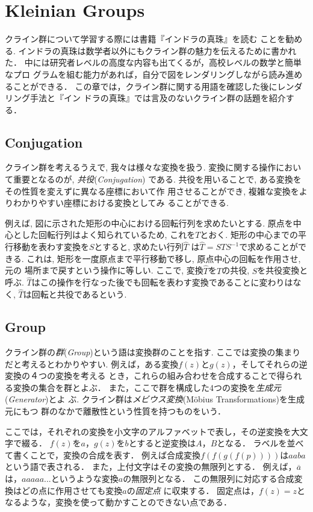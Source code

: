 
\section{Kleinian Groups}

クライン群について学習する際には書籍『インドラの真珠』\cite{indra}を読む
ことを勧める.
インドラの真珠は数学者以外にもクライン群の魅力を伝えるために書かれた．
中には研究者レベルの高度な内容も出てくるが，高校レベルの数学と簡単なプロ
グラムを組む能力があれば，自分で図をレンダリングしながら読み進めることができる．
この章では，クライン群に関する用語を確認した後にレンダリング手法と『イン
ドラの真珠』では言及のないクライン群の話題を紹介する．

\subsection{Conjugation}

クライン群を考えるうえで, 我々は様々な変換を扱う.
変換に関する操作において重要となるのが, \emph{共役}(\textit{Conjugation})
である.
共役を用いることで, ある変換をその性質を変えずに異なる座標において作
用させることができ, 複雑な変換をよりわかりやすい座標における変換としてみ
ることができる.

例えば, 図に示された矩形の中心における回転行列を求めたいとする.
原点を中心とした回転行列はよく知られているため, これを$T$とおく.
矩形の中心までの平行移動を表わす変換を$S$とすると, 求めたい行列$\hat{T}$
は$\hat{T} = STS^{-1}$で求めることができる.
これは, 矩形を一度原点まで平行移動で移し, 原点中心の回転を作用させ, 元の
場所まで戻すという操作に等しい.
ここで, 変換$\hat{T}$を$T$の共役, $S$を共役変換と呼ぶ.
$\hat{T}$はこの操作を行なった後でも回転を表わす変換であることに変わりはなく,
$\hat{T}$は回転と共役であるという.

\subsection{Group}

クライン群の\emph{群}(\textit{Group})という語は変換群のことを指す.
ここでは変換の集まりだと考えるとわかりやすい.
例えば，ある変換$f(z)$と$g(z)$，そしてそれらの逆変換の４つの変換を考える
とき，これらの組み合わせを合成することで得られる変換の集合を群とよぶ．
また，ここで群を構成した4つの変換を\emph{生成元}(\textit{Generator})とよ
ぶ.
クライン群は\emph{メビウス変換}(M\"obius Transformations)を生成元にもつ
群のなかで離散性という性質を持つものをいう．

ここでは，それぞれの変換を小文字のアルファベットで表し，その逆変換を大文字で綴る．
$f(z)$を$a$，$g(z)$を$b$とすると逆変換は$A$，$B$となる．
ラベルを並べて書くことで，変換の合成を表す．
例えば合成変換$f(f(g(f(p))))$は$aaba$という語で表される．
また，上付文字はその変換の無限列とする．
例えば，$\overline{a}$は，$aaaaa...$というような変換$a$の無限列となる．
この無限列に対応する合成変換はどの点に作用させても変換$a$の\emph{固定点}
に収束する．
固定点は，$f(z) = z$となるような，変換を使って動かすことのできない点である．

